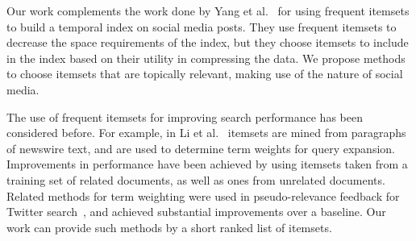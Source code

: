 \documentclass{sig-alternate}
\begin{document}
Our work complements the work done by Yang et al.~\cite{yang2012framework} for using 
frequent itemsets to build a temporal index on social media posts. 
They use frequent itemsets to decrease the space requirements of the index,  
but they choose itemsets to include in the index based on their utility in compressing the data. 
We propose methods to choose itemsets that are topically relevant, 
making use of the nature of social media.




The use of frequent itemsets for improving search performance has been considered before. 
For example, in Li et al.~\cite{li2010mining} itemsets are mined from
paragraphs of newswire text, and are used to determine term weights for query
expansion.
Improvements in performance have been achieved by using itemsets taken from
a training set of related documents, as well as ones from unrelated documents.
Related methods for term weighting were
used in pseudo-relevance feedback for Twitter search~\cite{abounlaga2012frequent,laumicroblog},
and achieved substantial improvements over a baseline.
Our work can provide such methods by a short ranked list of itemsets.
\end{document}
